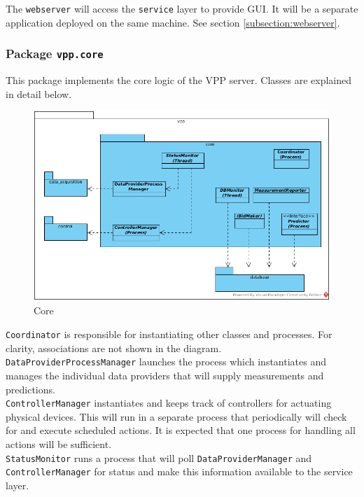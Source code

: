 The \texttt{webserver} will access the \texttt{service} layer to provide GUI. It will be a separate application deployed on the same machine. See section \ref{subsection:webserver}.



\subsubsection{Package \texttt{vpp.core}}
This package implements the core logic of the VPP server. Classes are explained in detail below.

\begin{figure}[H]
    \centering
    \includegraphics[width=\textwidth]{figures/class_core}
    \caption{Core}
    \label{figureClassDiagram}
\end{figure}

\texttt{Coordinator} is responsible for instantiating other classes and processes. For clarity, associations are not shown in the diagram.\\

\texttt{DataProviderProcessManager} launches the process which instantiates and manages the individual data providers that will supply measurements and predictions. \\

\texttt{ControllerManager} instantiates and keeps track of controllers for actuating physical devices. This will run in a separate process that periodically will check for and execute scheduled actions. It is expected that one process for handling all actions will be sufficient. \\

\texttt{StatusMonitor} runs a process that will poll \texttt{DataProviderManager} and \texttt{ControllerManager} for status and make this information available to the service layer.\\

